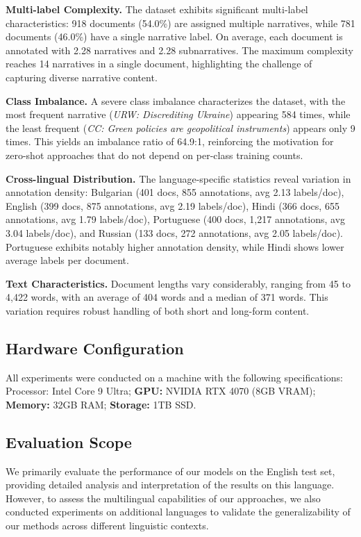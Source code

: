 \textbf{Multi-label Complexity.} The dataset exhibits significant multi-label characteristics: 918 documents (54.0\%) are assigned multiple narratives, while 781 documents (46.0\%) have a single narrative label. On average, each document is annotated with 2.28 narratives and 2.28 subnarratives. The maximum complexity reaches 14 narratives in a single document, highlighting the challenge of capturing diverse narrative content.

\textbf{Class Imbalance.} A severe class imbalance characterizes the dataset, with the most frequent narrative (\textit{URW: Discrediting Ukraine}) appearing 584 times, while the least frequent (\textit{CC: Green policies are geopolitical instruments}) appears only 9 times. This yields an imbalance ratio of 64.9:1, reinforcing the motivation for zero-shot approaches that do not depend on per-class training counts.

\textbf{Cross-lingual Distribution.} The language-specific statistics reveal variation in annotation density: Bulgarian (401 docs, 855 annotations, avg 2.13 labels/doc), English (399 docs, 875 annotations, avg 2.19 labels/doc), Hindi (366 docs, 655 annotations, avg 1.79 labels/doc), Portuguese (400 docs, 1,217 annotations, avg 3.04 labels/doc), and Russian (133 docs, 272 annotations, avg 2.05 labels/doc). Portuguese exhibits notably higher annotation density, while Hindi shows lower average labels per document.

\textbf{Text Characteristics.} Document lengths vary considerably, ranging from 45 to 4,422 words, with an average of 404 words and a median of 371 words. This variation requires robust handling of both short and long-form content.

\subsection{Hardware Configuration}

All experiments were conducted on a machine with the following specifications: {Processor:} Intel Core 9 Ultra; \textbf{GPU:} NVIDIA RTX 4070 (8GB VRAM); \textbf{Memory:} 32GB RAM; \textbf{Storage:} 1TB SSD.

\subsection{Evaluation Scope}

We primarily evaluate the performance of our models on the English test set, providing detailed analysis and interpretation of the results on this language. However, to assess the multilingual capabilities of our approaches, we also conducted experiments on additional languages to validate the generalizability of our methods across different linguistic contexts.